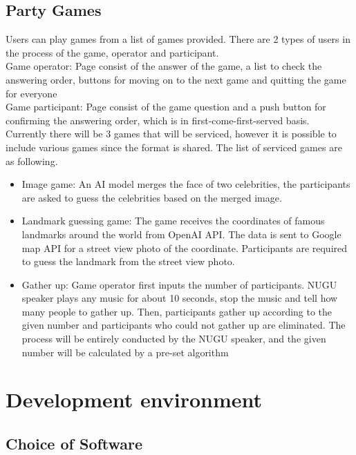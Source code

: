 \documentclass[conference]{IEEEtran}
\begin{document}
    \subsection{Party Games}
    Users can play games from a list of games provided. There are 2 types of users in the process of the game, operator and participant. \\
    
    Game operator: Page consist of the answer of the game, a list to check the answering order, buttons for moving on to the next game and quitting the game for everyone\\
    
    Game participant: Page consist of the game question and a push button for confirming the answering order, which is in first-come-first-served basis.\\
    
    Currently there will be 3 games that will be serviced, however it is possible to include various games since the format is shared. The list of serviced games are as following.\\

    \begin{itemize}
        \item Image game: An AI model merges the face of two celebrities, the participants are asked to guess the celebrities based on the merged image.
        \item Landmark guessing game: The game receives the coordinates of famous landmarks around the world from OpenAI API. The data is sent to Google map API for a street view photo of the coordinate. Participants are required to guess the landmark from the street view photo.
        \item Gather up: Game operator first inputs the number of participants. NUGU speaker plays any music for about 10 seconds, stop the music and tell how many people to gather up. Then, participants gather up according to the given number and participants who could not gather up are eliminated. The process will be entirely conducted by the NUGU speaker, and the given number will be calculated by a pre-set algorithm
    \end{itemize}
    
\section{Development environment}
    \subsection{Choice of Software}
    
\end{document}

